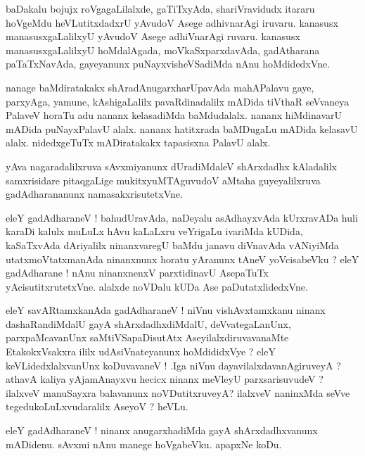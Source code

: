 \documentclass{article}
\begin{document}
\begin{mn}%
baDakalu bojujx roVgagaLilalxde, gaTiTxyAda, shariVravidudx itararu hoVgeMdu heVLutitxdadxrU 
yAvudoV Asege adhivnarAgi iruvaru. kanasusx manasusxgaLalilxyU yAvudoV Asege adhiVnarAgi 
ruvaru. kanasusx manasusxgaLalilxyU hoMdalAgada, moVkaSxparxdavAda, gadAtharana 
paTaTxNavAda, gayeyanunx puNayxvisheVSadiMda nAnu hoMdidedxVne.
\end{mn}

\begin{mn}%
nanage baMdiratakakx shAradAnugarxharUpavAda mahAPalavu gaye, parxyAga, yamune, 
kAshigaLalilx pavaRdinadalilx mADida tiVthaR seVvaneya PalaveV horaTu adu nananx kelasadiMda 
baMdudalalx. nananx hiMdinavarU mADida puNayxPalavU alalx. nananx hatitxrada baMDugaLu 
mADida kelasavU alalx. nidedxgeTuTx mADiratakakx tapasisxna PalavU alalx.
\end{mn}

\begin{mn}%
yAva nagaradalilxruva sAvxmiyanunx dUradiMdaleV shArxdadhx kAladalilx samxrisidare 
pitaqgaLige mukitxyuMTAguvudoV aMtaha guyeyalilxruva gadAdharananunx namasakxrisutetxVne.
\end{mn}

\begin{mn}%
eleY gadAdharaneV ! bahudUravAda, naDeyalu asAdhayxvAda kUrxravADa huli karaDi kalulx muLuLx 
hAvu kaLaLxru veYrigaLu ivariMda kUDida, kaSaTxvAda dAriyalilx ninanxvaregU baMdu janavu 
diVnavAda vANiyiMda utatxmoVtatxmanAda ninanxnunx horatu yAranunx tAneV yoVcisabeVku ? eleY 
gadAdharane ! nAnu ninanxnenxV parxtidinavU AsepaTuTx yAcisutitxrutetxVne. alalxde noVDalu 
kUDa Ase paDutatxlidedxVne.
\end{mn}

\begin{mn}%
eleY savARtamxkanAda gadAdharaneV ! niVnu vishAvxtamxkanu ninanx dashaRandiMdalU gayA 
shArxdadhxdiMdalU, deVvategaLanUnx, parxpaMcavanUnx saMtiVSapaDisutAtx 
AseyilalxdiruvavanaMte EtakokxVsakxra ililx udAsiVnateyanunx hoMdididxVye ? eleY 
keVLidedxlalxvanUnx koDuvavaneV ! .Iga niVnu dayavilalxdavanAgiruveyA ? athavA kaliya 
yAjamAnayxvu hecicx ninanx meVleyU parxsarisuvudeV ? ilalxveV manuSayxra balavanunx 
noVDutitxruveyA? ilalxveV naninxMda seVve tegedukoLuLxvudaralilx AseyoV ? heVLu.
\end{mn}

\begin{mn}%
eleY gadAdharaneV ! ninanx anugarxhadiMda gayA shArxdadhxvanunx mADidenu. sAvxmi nAnu manege 
hoVgabeVku. apapxNe koDu.
\end{mn}
\end{document}

